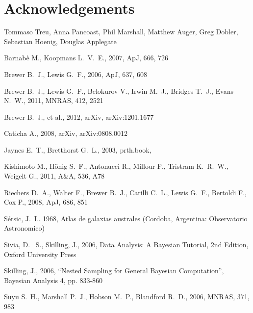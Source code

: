 \documentclass[letterpaper, 11pt]{article}
\begin{document}
\section*{Acknowledgements}
Tommaso Treu, Anna Pancoast, Phil Marshall, Matthew Auger, Greg Dobler, Sebastian Hoenig, Douglas Applegate


\begin{thebibliography}{99}
 Barnab{\`e} M., Koopmans L.~V.~E., 2007, ApJ, 666, 726 

 Brewer B.~J., Lewis G.~F., 2006, ApJ, 637, 608 

Brewer B.~J., Lewis G.~F., Belokurov V., Irwin M.~J., Bridges T.~J., Evans 
N.~W., 2011, MNRAS, 412, 2521 

Brewer B.~J., et al., 2012, arXiv, arXiv:1201.1677 

Caticha A., 2008, arXiv, arXiv:0808.0012 

 Jaynes E.~T., Bretthorst G.~L., 2003, prth.book,  

 Kishimoto M., H{\"o}nig S.~F., Antonucci R., Millour F., Tristram K.~R.~W., Weigelt G., 2011, A\&A, 536, A78 

 Riechers D.~A., Walter F., Brewer B.~J., 
Carilli C.~L., Lewis G.~F., Bertoldi F., Cox P., 2008, ApJ, 686, 851 

{S{\'e}rsic}, J.~L. 1968, {Atlas de galaxias australes} (Cordoba, Argentina:
  Observatorio Astronomico)


 Sivia, 
D.~ S., Skilling, J., 2006, Data Analysis: A Bayesian Tutorial, 2nd 
Edition, Oxford University Press

 Skilling, 
J., 2006, ``Nested Sampling for General Bayesian Computation'', Bayesian 
Analysis 4, pp. 833-860

Suyu S.~H., Marshall P.~J., Hobson M.~P., Blandford R.~D., 2006, MNRAS, 
371, 983 


\end{thebibliography}
\end{document}
